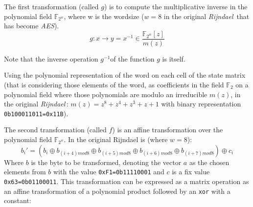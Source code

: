 \documentclass[10pt,a4paper,twoside]{llncs}
\newcommand{\rijndael}{\emph{Rijndael}}
\newcommand{\Fq}[1]{\ensuremath{\mathbb{F}_#1}}
\newcommand{\Fpn}[2]{\ensuremath{\mathbb{F}_{#1^#2}}}
\newcommand{\Fpnm}[2]{\ensuremath{\frac{\Fpn{2}{#1}[#2]}{m(#2)}}}
\begin{document}
The first transformation (called $g$) is to compute the multiplicative inverse in the polynomial field \Fpn{2}{w}, where w is the wordsize ($w=8$ in the original \rijndael\, that has become \emph{AES}).
\begin{equation}\label{eq:multInvPolyField}
 g:x\rightarrow y = x^{-1} \in \Fpnm{w}{z} 
\end{equation}

Note that the inverse operation $g^{-1}$of the function $g$ is itself.

Using the polynomial representation of the word on each cell of the state matrix (that is considering those elements of the word, as coefficients in the field \Fq{2} on a polynomial field where those polynomials are modulo an irreducible $m(z)$, in the original \rijndael\,: $m(z)=z^8+z^4+z^3+z+1$ with binary representation \texttt{0b100011011=0x11B}).

The second transformation (called $f$) is an affine transformation over the polynomial field \Fpn{2}{w}. In the original Rijndael is (where $w=8$):
\begin{equation}\label{eq:subBytes:affine}
 b_{i}' = (b_{i} \oplus b_{(i+4)mod8} \oplus b_{(i+5)mod8} \oplus 
          b_{(i+6)mod8} \oplus b_{(i+7)mod8}) \oplus c_{i}
\end{equation}
Where $b$ is the byte to be transformed, denoting the vector $a$ as the chosen elements from $b$ with the value \texttt{0xF1=0b11110001} and $c$ is a fix value \texttt{0x63=0b01100011}. This transformation can be expressed as a matrix operation as an affine transformation of a polynomial product followed by an {\tt xor} with a constant:
\end{document}

